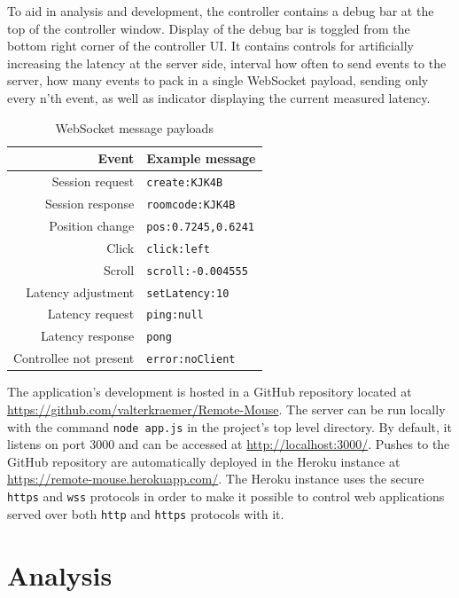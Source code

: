 \documentclass[a4paper,english,twocolumn]{article}
\begin{document}
To aid in analysis and development, the controller contains a debug
bar at the top of the controller window. Display of the debug bar is
toggled from the bottom right corner of the controller UI. It contains
controls for artificially increasing the latency at the server side,
interval how often to send events to the server, how many events to
pack in a single WebSocket payload, sending only every n'th event, as
well as indicator displaying the current measured latency.

\begin{table} \centering
  \begin{tabular}{rl}
    Event & Example message \\
    \hline
    Session request & \verb!create:KJK4B! \\
    Session response & \verb!roomcode:KJK4B! \\
    Position change & \verb!pos:0.7245,0.6241! \\
    Click & \verb!click:left! \\
    Scroll & \verb!scroll:-0.004555! \\
    Latency adjustment & \verb!setLatency:10! \\
    Latency request & \verb!ping:null! \\
    Latency response & \verb!pong! \\
    Controllee not present & \verb!error:noClient! \\
    \hline
  \end{tabular}
  \caption{WebSocket message payloads}
  \label{table:messages}
\end{table}

The application's development is hosted in a GitHub repository located
at \url{https://github.com/valterkraemer/Remote-Mouse}. The server can
be run locally with the command \verb!node app.js! in the project's
top level directory. By default, it listens on port 3000 and can be
accessed at \url{http://localhost:3000/}. Pushes to the GitHub
repository are automatically deployed in the Heroku instance at
\url{https://remote-mouse.herokuapp.com/}. The Heroku instance uses
the secure \verb!https! and \verb!wss! protocols in order to make it
possible to control web applications served over both \verb!http! and
\verb!https! protocols with it.

\section{Analysis}
\end{document}
